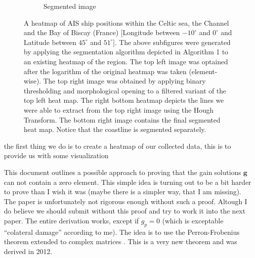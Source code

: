 \documentclass{article}
\begin{document}
\begin{figure}[ht]
\begin{subfigure}[b]{0.5\linewidth}
    \caption{Segmented image} 
    \label{fig7:d} 
  \end{subfigure} 
  \caption{A heatmap of AIS ship positions within the Celtic sea, the Channel and the Bay of Biscay (France) [Longitude between $-10^{\circ}$ and $0^{\circ}$ and Latitude between $45^{\circ}$ and $51^{\circ}$]. The above subfigures were generated by applying the segmentation algorithm depicted in Algorithm 1 to an existing heatmap of the region. The top left image was optained after the logarithm of the original heatmap was taken (element-wise). The top right image 
  was obtained by applying binary thresholding and morphological opening to a filtered variant of the top left heat map. The right bottom heatmap depicts the lines we were able to extract 
  from the top right image using the Hough Transform. The bottom right image contains the final segmented heat map. Notice that the coastline is segmented separately.}
  \label{fig7} 
\end{figure}

the first thing we do is to create a heatmap of our collected data, this is to provide us with some visualization 

This document outlines a possible approach to proving that the gain solutions $\boldsymbol{g}$ can not contain a zero element. This simple idea is turning
out to be a bit harder to prove than I wish it was (maybe there is a simpler way, that I am missing). The paper is unfortunately not rigorous enough without such a proof. Altough I do believe we should submit without
this proof and try to work it into the next paper. The entire derivation works, except if $g_p = 0$ (which is exceptable ``colateral damage'' according to me). The idea is
to use the Perron-Frobenius theorem extended to complex matrices \cite{Noutsos2012}. This is a very new theorem and was derived in 2012. 
\end{document}
